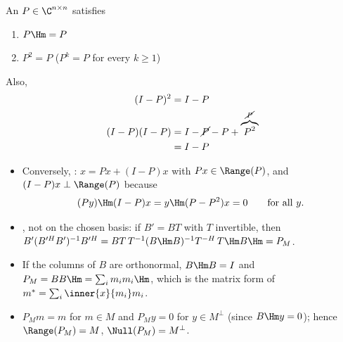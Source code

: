 \begin{remark}
An  $P\in\C^{n\times n}$ satisfies
\begin{enumerate}[label=\roman*-), nosep]
  \item $P\Hm = P$
  \item $P^2 = P$ \quad ($P^k = P$ for every $k\ge 1$)
\end{enumerate}
Also,
\begin{align*}
(I-P)^2 &= I-P\\
(I-P)(I-P) &= I-\cancel{P}-P+\overbrace{P^2}^{\cancel{P}}\\
&= I-P
\end{align*}
\end{remark}
\begin{insight}[Remarks on $P_M$]
\begin{itemize}[nosep]
  \item Conversely, :
        $x = Px + (I-P)x$ with $Px\in\Range(P)$, and $(I-P)x\perp\Range(P)$ because
        \[
        (Py)\Hm(I-P)x = y\Hm(P-P^2)x = 0 \qquad\text{for all } y.
        \]
  \item {}, not on the chosen basis: if $B' = BT$ with $T$ invertible, then
        $B'(B'^H B')^{-1}B'^H = BT\,T^{-1}(B\Hm B)^{-1}T^{-H}\,T\Hm B\Hm = P_M$.
  \item If the columns of $B$ are orthonormal, $B\Hm B = I$ and $P_M = BB\Hm = \sum_i m_i m_i\Hm$,
        which is the matrix form of $m^* = \sum_i\inner{x}{m_i}m_i$.
  \item $P_M m = m$ for $m\in M$ and $P_M y = 0$ for $y\in M^\perp$ (since $B\Hm y = 0$);
        hence $\Range(P_M) = M$, $\Null(P_M) = M^\perp$.
\end{itemize}
\end{insight}

